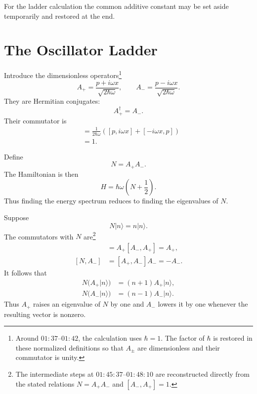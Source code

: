 For the ladder calculation the common additive constant may be set aside temporarily and restored at the end.

\begin{classroomqa}
\end{classroomqa}

\section{The Oscillator Ladder}

Introduce the dimensionless operators\footnote{Around \(01{:}37\)--\(01{:}42\), the calculation uses \(\hbar=1\). The factor of \(\hbar\) is restored in these normalized definitions so that \(A_\pm\) are dimensionless and their commutator is unity.}
\begin{equation}
A_+=\frac{p+i\omega x}{\sqrt{2\hbar\omega}},
\qquad
A_-=\frac{p-i\omega x}{\sqrt{2\hbar\omega}}.
\end{equation}
They are Hermitian conjugates:
\begin{equation}
A_+^\dagger=A_-.
\end{equation}
Their commutator is
\begin{align}
[A_-,A_+]
&=\frac{1}{2\hbar\omega}
\left([p,i\omega x]+[-i\omega x,p]\right) \\
&=1.
\end{align}

Define
\begin{equation}
N=A_+A_-.
\end{equation}
The Hamiltonian is then
\begin{equation}
H=\hbar\omega\left(N+\frac{1}{2}\right).
\end{equation}
Thus finding the energy spectrum reduces to finding the eigenvalues of \(N\).

Suppose
\begin{equation}
N|n\rangle=n|n\rangle.
\end{equation}
The commutators with \(N\) are\footnote{The intermediate steps at \(01{:}45{:}37\)--\(01{:}48{:}10\) are reconstructed directly from the stated relations \(N=A_+A_-\) and \([A_-,A_+]=1\).}
\begin{align}
[N,A_+]
&=A_+[A_-,A_+]=A_+, \\
[N,A_-]
&=[A_+,A_-]A_-=-A_-.
\end{align}
It follows that
\begin{align}
N\bigl(A_+|n\rangle\bigr)
&=(n+1)A_+|n\rangle, \\
N\bigl(A_-|n\rangle\bigr)
&=(n-1)A_-|n\rangle.
\end{align}
Thus \(A_+\) raises an eigenvalue of \(N\) by one and \(A_-\) lowers it by one whenever the resulting vector is nonzero.

